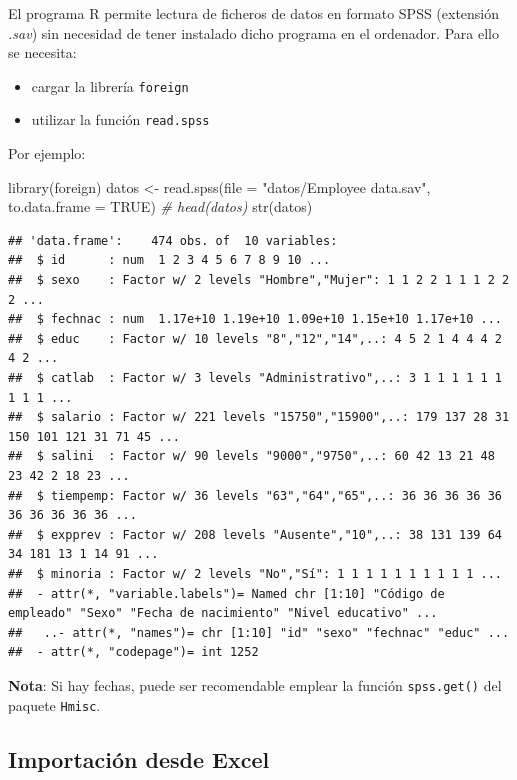 \documentclass[
]{book}
\newenvironment{Shaded}{\begin{snugshade}}{\end{snugshade}}
\newcommand{\AttributeTok}[1]{\textcolor[rgb]{0.77,0.63,0.00}{#1}}
\newcommand{\CommentTok}[1]{\textcolor[rgb]{0.56,0.35,0.01}{\textit{#1}}}
\newcommand{\ConstantTok}[1]{\textcolor[rgb]{0.00,0.00,0.00}{#1}}
\newcommand{\FunctionTok}[1]{\textcolor[rgb]{0.00,0.00,0.00}{#1}}
\newcommand{\NormalTok}[1]{#1}
\newcommand{\OtherTok}[1]{\textcolor[rgb]{0.56,0.35,0.01}{#1}}
\newcommand{\StringTok}[1]{\textcolor[rgb]{0.31,0.60,0.02}{#1}}
\theoremstyle{break}
\begin{document}
El programa R permite
lectura de ficheros de datos en formato SPSS (extensión \emph{.sav}) sin
necesidad de tener instalado dicho programa en el ordenador. Para ello
se necesita:

\begin{itemize}
\item
  cargar la librería \texttt{foreign}
\item
  utilizar la función \texttt{read.spss}
\end{itemize}

Por ejemplo:

\begin{Shaded}
\begin{Highlighting}[]
\FunctionTok{library}\NormalTok{(foreign)}
\NormalTok{datos }\OtherTok{\textless{}{-}} \FunctionTok{read.spss}\NormalTok{(}\AttributeTok{file =} \StringTok{"datos/Employee data.sav"}\NormalTok{, }\AttributeTok{to.data.frame =} \ConstantTok{TRUE}\NormalTok{)}
\CommentTok{\# head(datos)}
\FunctionTok{str}\NormalTok{(datos)}
\end{Highlighting}
\end{Shaded}

\begin{verbatim}
## 'data.frame':    474 obs. of  10 variables:
##  $ id      : num  1 2 3 4 5 6 7 8 9 10 ...
##  $ sexo    : Factor w/ 2 levels "Hombre","Mujer": 1 1 2 2 1 1 1 2 2 2 ...
##  $ fechnac : num  1.17e+10 1.19e+10 1.09e+10 1.15e+10 1.17e+10 ...
##  $ educ    : Factor w/ 10 levels "8","12","14",..: 4 5 2 1 4 4 4 2 4 2 ...
##  $ catlab  : Factor w/ 3 levels "Administrativo",..: 3 1 1 1 1 1 1 1 1 1 ...
##  $ salario : Factor w/ 221 levels "15750","15900",..: 179 137 28 31 150 101 121 31 71 45 ...
##  $ salini  : Factor w/ 90 levels "9000","9750",..: 60 42 13 21 48 23 42 2 18 23 ...
##  $ tiempemp: Factor w/ 36 levels "63","64","65",..: 36 36 36 36 36 36 36 36 36 36 ...
##  $ expprev : Factor w/ 208 levels "Ausente","10",..: 38 131 139 64 34 181 13 1 14 91 ...
##  $ minoria : Factor w/ 2 levels "No","Sí": 1 1 1 1 1 1 1 1 1 1 ...
##  - attr(*, "variable.labels")= Named chr [1:10] "Código de empleado" "Sexo" "Fecha de nacimiento" "Nivel educativo" ...
##   ..- attr(*, "names")= chr [1:10] "id" "sexo" "fechnac" "educ" ...
##  - attr(*, "codepage")= int 1252
\end{verbatim}

\textbf{Nota}: Si hay fechas, puede ser recomendable emplear la función \texttt{spss.get()} del paquete \texttt{Hmisc}.

\hypertarget{importaciuxf3n-desde-excel}{%
\subsection{Importación desde Excel}\label{importaciuxf3n-desde-excel}}
\end{document}
